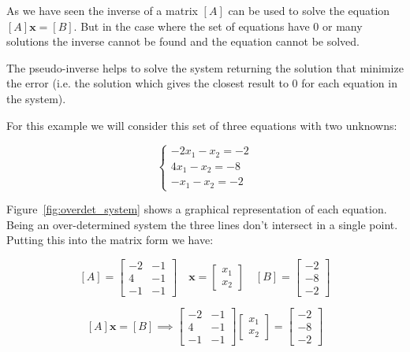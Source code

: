 As we have seen the inverse of a matrix \([A]\) can be used to solve the equation \([A]\boldsymbol{x}=[B]\). But in the case where the set of equations have 0 or many solutions the inverse cannot be found and the equation cannot be solved. 

The pseudo-inverse helps to solve the system returning the solution that minimize the error (i.e. the solution which gives the closest result to 
0 for each equation in the system). 

For this example we will consider this set of three equations with two
unknowns:

\[
\begin{cases}
−2x_1−x_2=−2 \\
4x_1−x_2=−8 \\
−x_1−x_2=−2 
\end{cases}\]


Figure~\ref{fig:overdet_system} shows a graphical representation of each equation. Being an over-determined system the three lines don't intersect in a single point. Putting this into the matrix form we have:

\[[A]=\begin{bmatrix}
−2&-1\\
4&-1\\
−1&−1\end{bmatrix}\quad 
\boldsymbol{x}=\begin{bmatrix}
x_1\\
x_2\end{bmatrix}\quad
[B]=\begin{bmatrix}
−2\\
−8\\
−2\end{bmatrix}\]

\[[A]\boldsymbol{x}=[B]\implies 
\begin{bmatrix}
−2&-1\\
4&-1\\
−1&−1\end{bmatrix}
\begin{bmatrix}
x_1\\
x_2\end{bmatrix}=
\begin{bmatrix}
−2\\
−8\\
−2\end{bmatrix}\]

